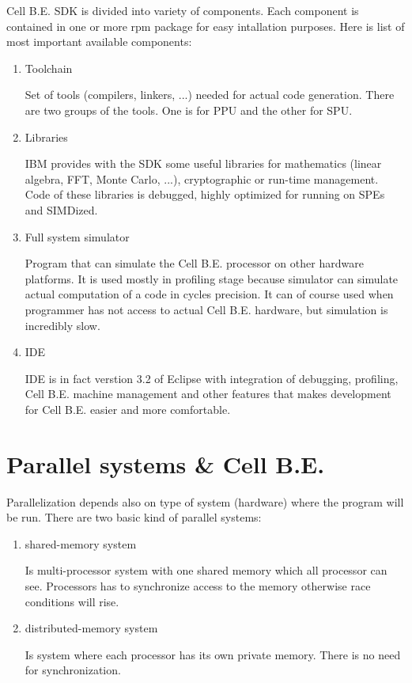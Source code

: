 Cell B.E. SDK is divided into variety of components.
Each component is contained in one or more rpm package for easy intallation purposes.
Here is list of most important available components:
\begin{enumerate}
  \item {Toolchain}
  \par
  Set of tools (compilers, linkers, ...) needed for actual code generation.
There are two groups of the tools.
One is for PPU and the other for SPU.

  \item {Libraries}
  \par
  IBM provides with the SDK some useful libraries for mathematics (linear algebra, FFT, Monte Carlo, ...), cryptographic or run-time management.
Code of these libraries is debugged, highly optimized for running on SPEs and SIMDized.

  \item {Full system simulator}
  \par
  Program that can simulate the Cell B.E. processor on other hardware platforms.
It is used mostly in profiling stage because simulator can simulate actual computation of a code in cycles precision.
It can of course used when programmer has not access to actual Cell B.E. hardware, but simulation is incredibly slow.

  \item {IDE}
  \par
  IDE is in fact verstion 3.2 of Eclipse with integration of debugging, profiling, Cell B.E. machine management and other features that makes development for Cell B.E. easier and more comfortable.
\end{enumerate}


\section{Parallel systems \& Cell B.E.}

Parallelization depends also on type of system (hardware) where the program will be run.
There are two basic kind of parallel systems:
\begin{enumerate}
\item {shared-memory system}
\par
Is multi-processor system with one shared memory which all processor can see.
Processors has to synchronize access to the memory otherwise race conditions will rise.

\item {distributed-memory system}
\par
Is system where each processor has its own private memory.
There is no need for synchronization.
\end{enumerate}

